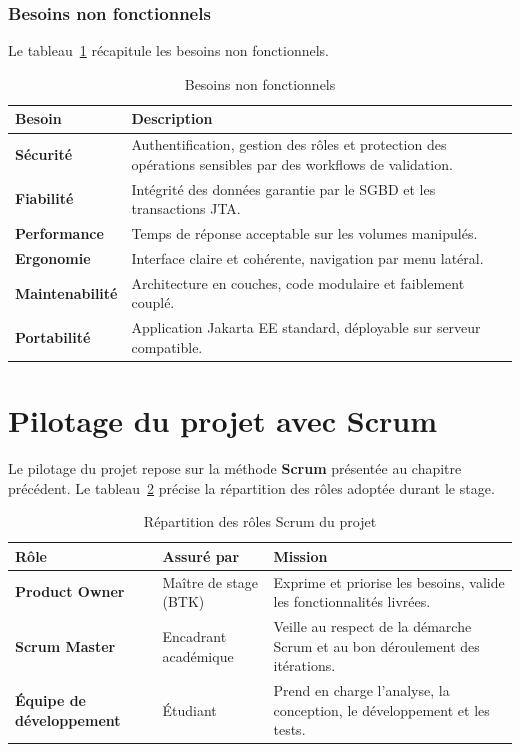 \subsubsection{Besoins non fonctionnels}
Le tableau~\ref{tab:bnf} récapitule les besoins non fonctionnels.

\begin{table}[htbp]
\centering
\caption{Besoins non fonctionnels}
\label{tab:bnf}
\renewcommand{\arraystretch}{1.2}
\begin{tabularx}{\textwidth}{>{\bfseries}p{3.4cm}X}
\toprule
\textmd{\textbf{Besoin}} & \textbf{Description}\\
\midrule
Sécurité & Authentification, gestion des rôles et protection des opérations
sensibles par des workflows de validation.\\
Fiabilité & Intégrité des données garantie par le SGBD et les transactions JTA.\\
Performance & Temps de réponse acceptable sur les volumes manipulés.\\
Ergonomie & Interface claire et cohérente, navigation par menu latéral.\\
Maintenabilité & Architecture en couches, code modulaire et faiblement couplé.\\
Portabilité & Application Jakarta EE standard, déployable sur serveur compatible.\\
\bottomrule
\end{tabularx}
\end{table}

\section{Pilotage du projet avec Scrum}
Le pilotage du projet repose sur la méthode \textbf{Scrum} présentée au chapitre
précédent. Le tableau~\ref{tab:roles_scrum} précise la répartition des rôles
adoptée durant le stage.

\begin{table}[htbp]
\centering
\caption{Répartition des rôles Scrum du projet}
\label{tab:roles_scrum}
\renewcommand{\arraystretch}{1.2}
\begin{tabularx}{\textwidth}{>{\bfseries}p{3.6cm}p{3.8cm}X}
\toprule
\textmd{\textbf{Rôle}} & \textbf{Assuré par} & \textbf{Mission}\\
\midrule
Product Owner & Maître de stage (BTK) & Exprime et priorise les besoins,
valide les fonctionnalités livrées.\\
Scrum Master & Encadrant académique & Veille au respect de la démarche Scrum et
au bon déroulement des itérations.\\
Équipe de développement & Étudiant & Prend en charge l'analyse, la conception, le
développement et les tests.\\
\bottomrule
\end{tabularx}
\end{table}

